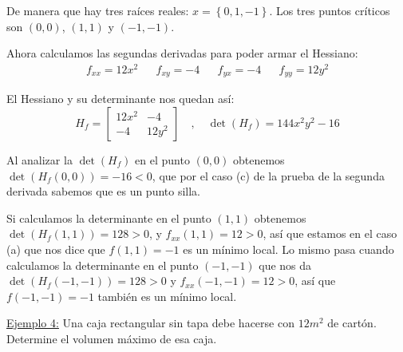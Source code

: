 \documentclass[12pt]{article}
\begin{document}
De manera que hay tres raíces reales: $ x=\left\{0,1,-1\right\} $. Los tres puntos críticos son $ (0,0) $, $ (1,1) $ y $ (-1,-1) $.

Ahora calculamos las segundas derivadas para poder armar el Hessiano:
\begin{align*}
  f_{xx} = 12x^2 && f_{xy} = -4 && f_{yx} = -4 && f_{yy} = 12y^2
\end{align*}

El Hessiano y su determinante nos quedan así:
\[H_{f}=
  \begin{bmatrix}
	  12x^2 & -4 \\
	  -4 & 12y^2
  \end{bmatrix} \quad  , \quad 
 \det(H_{f}) = 144x^2y^2-16 
\]

Al analizar la $ \det(H_{f}) $ en el punto $ (0,0) $ obtenemos $ \det(H_{f}(0,0))=-16 < 0 $, que por el caso (c) de la prueba de la segunda derivada sabemos que es un punto silla.

Si calculamos la determinante en el punto $ (1,1) $ obtenemos $ \det(H_{f}(1,1))=128>0 $, y $ f_{xx}(1,1)=12>0 $, así que estamos en el caso (a) que nos dice que $ f(1,1)=-1 $ es un mínimo local. Lo mismo pasa cuando calculamos la determinante en el punto $ (-1,-1) $ que nos da $ \det(H_{f}(-1,-1))=128>0 $ y $ f_{xx}(-1,-1)=12>0 $, así que $ f(-1,-1)=-1 $ también es un mínimo local.


\begin{center}
\end{center}

\underline{Ejemplo 4:} Una caja rectangular sin tapa debe hacerse con $ 12 m^2 $ de cartón. Determine el volumen máximo de esa caja.
\end{document}
